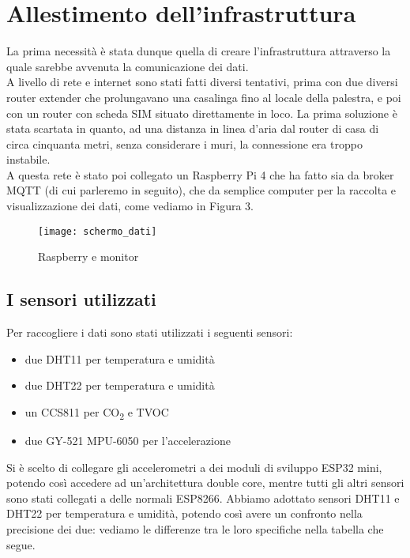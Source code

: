 \documentclass[fleqn,10pt]{SelfArx} %
\begin{document}

\section{Allestimento dell'infrastruttura}

La prima necessità è stata dunque quella di creare l'infrastruttura attraverso la quale sarebbe avvenuta la 
comunicazione dei dati.\\
A livello di rete e internet sono stati fatti diversi tentativi, prima con due diversi router extender che 
prolungavano una casalinga fino al locale della palestra, e poi con un router con scheda SIM 
situato direttamente in loco. La prima soluzione è stata scartata in quanto, ad una distanza in linea d'aria 
dal router di casa di circa cinquanta metri, senza considerare i muri, la connessione era troppo instabile.\\

A questa rete è stato poi collegato un Raspberry Pi 4 che ha fatto sia da broker MQTT (di cui parleremo in seguito), 
che da semplice computer per la raccolta e visualizzazione dei dati, come vediamo in Figura 3.

\begin{figure}[htb!]\centering
	\texttt{[image: schermo\_dati]}
	\caption{Raspberry e monitor}
	\label{fig:schermo}
\end{figure}

\subsection{I sensori utilizzati}

Per raccogliere i dati sono stati utilizzati i seguenti sensori:

\begin{itemize}[noitemsep] %
	\item due DHT11 per temperatura e umidità
	\item due DHT22 per temperatura e umidità
	\item un CCS811 per CO\textsubscript{2} e TVOC
	\item due GY-521 MPU-6050 per l'accelerazione
\end{itemize}

Si è scelto di collegare gli accelerometri a dei moduli di sviluppo ESP32 mini, potendo così accedere ad 
un'architettura double core, mentre tutti gli altri sensori sono stati collegati a delle normali ESP8266. 
Abbiamo adottato sensori DHT11 e DHT22 per temperatura e umidità, potendo così avere un confronto nella 
precisione dei due: vediamo le differenze tra le loro specifiche nella tabella che segue.
\end{document}
